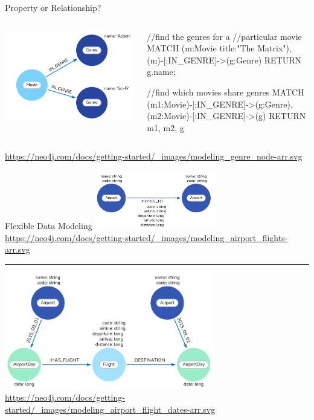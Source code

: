 \documentclass[ignorenonframetext,xcolor=x11names]{beamer}
\begin{document}
\begin{frame}[fragile]{Property or Relationship?}
\begin{columns}
\begin{column}{.35\textwidth}
\includegraphics[width=\columnwidth]{screen6.png}
\end{column}
\begin{column}{.65\textwidth}
\scriptsize
\begin{cyphercode}
//find the genres for a 
//particular movie
MATCH (m:Movie {title:"The Matrix"}),
      (m)-[:IN_GENRE]->(g:Genre)
RETURN g.name;

//find which movies share genres
MATCH (m1:Movie)-[:IN_GENRE]->(g:Genre),
      (m2:Movie)-[:IN_GENRE]->(g)
RETURN m1, m2, g
\end{cyphercode}
\end{column}
\end{columns}
\tiny{\url{https://neo4j.com/docs/getting-started/\_images/modeling\_genre\_node-arr.svg}}
\end{frame}

\begin{frame}{Flexible Data Modeling}
\centering
\includegraphics[height=1in]{screen7.png}
\tiny{\url{https://neo4j.com/docs/getting-started/_images/modeling_airport_flights-arr.svg}} \hrule
\includegraphics[height=2in]{screen8.png}
\tiny{\url{https://neo4j.com/docs/getting-started/_images/modeling_airport_flight_dates-arr.svg}}
\end{frame}
\end{document}
